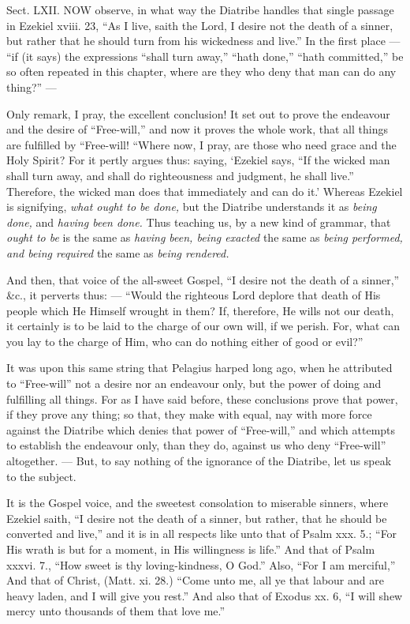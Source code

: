 
Sect. LXII. NOW observe, in what way the Diatribe handles that single passage in Ezekiel xviii. 23, “As I live, saith the Lord, I desire not the death of a sinner, but rather that he should turn from his wickedness and live.” In the first place — “if (it says) the expressions “shall turn away,” “hath done,” “hath committed,” be so often repeated in this chapter, where are they who deny that man can do any thing?” —

Only remark, I pray, the excellent conclusion! It set out to prove the endeavour and the desire of “Free-will,” and now it proves the whole work, that all things are fulfilled by “Free-will! “Where now, I pray, are those who need grace and the Holy Spirit? For it pertly argues thus: saying, ‘Ezekiel says, “If the wicked man shall turn away, and shall do righteousness and judgment, he shall live.” Therefore, the wicked man does that immediately and can do it.’ Whereas Ezekiel is signifying, \emph{ what ought to be done, }but the Diatribe understands it as \emph{being done, }and \emph{having been done. }Thus teaching us, by a new kind of grammar, that \emph{ought to be }is the same as \emph{having been, being exacted } the same as \emph{being performed, and being required }the same as \emph{being rendered.}

And then, that voice of the all-sweet Gospel, “I desire not the death of a sinner,” \&c., it perverts thus: — “Would the righteous Lord deplore that death of His people which He Himself wrought in them? If, therefore, He wills not our death, it certainly is to be laid to the charge of our own will, if we perish. For, what can you lay to the charge of Him, who can do nothing either of good or evil?”

It was upon this same string that Pelagius harped long ago, when he attributed to “Free-will” not a desire nor an endeavour only, but the power of doing and fulfilling all things. For as I have said before, these conclusions prove that power, if they prove any thing; so that, they make with equal, nay with more force against the Diatribe which denies that power of “Free-will,” and which attempts to establish the endeavour only, than they do, against us who deny “Free-will” altogether. — But, to say nothing of the ignorance of the Diatribe, let us speak to the subject.

It is the Gospel voice, and the sweetest consolation to miserable sinners, where Ezekiel saith, “I desire not the death of a sinner, but rather, that he should be converted and live,” and it is in all respects like unto that of Psalm xxx. 5.; “For His wrath is but for a moment, in His willingness is life.” And that of Psalm xxxvi. 7., “How sweet is thy loving-kindness, O God.” Also, “For I am merciful,” And that of Christ, (Matt. xi. 28.) “Come unto me, all ye that labour and are heavy laden, and I will give you rest.” And also that of Exodus xx. 6, “I will shew mercy unto thousands of them that love me.”

